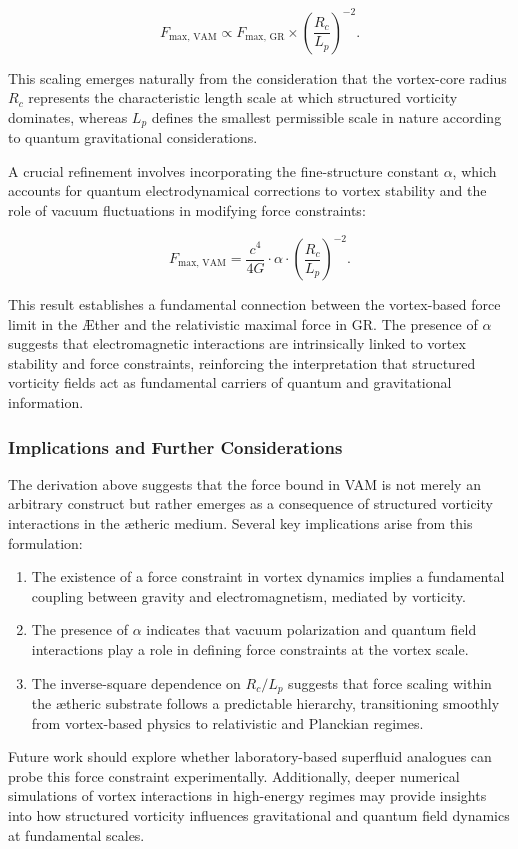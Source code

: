 \begin{equation*}
F_\text{max, VAM} \propto F_\text{max, GR} \times \left(\frac{R_c}{L_p}\right)^{-2}.
\end{equation*}


This scaling emerges naturally from the consideration that the vortex-core radius $R_c$ represents the characteristic length scale at which structured vorticity dominates, whereas $L_p$ defines the smallest permissible scale in nature according to quantum gravitational considerations.


A crucial refinement involves incorporating the fine-structure constant $\alpha$, which accounts for quantum electrodynamical corrections to vortex stability and the role of vacuum fluctuations in modifying force constraints:


\begin{equation*}
F_\text{max, VAM} = \frac{c^4}{4G} \cdot \alpha \cdot \left(\frac{R_c}{L_p}\right)^{-2}.
\end{equation*}


This result establishes a fundamental connection between the vortex-based force limit in the Æther and the relativistic maximal force in GR. The presence of $\alpha$ suggests that electromagnetic interactions are intrinsically linked to vortex stability and force constraints, reinforcing the interpretation that structured vorticity fields act as fundamental carriers of quantum and gravitational information.


\subsubsection*{Implications and Further Considerations}
The derivation above suggests that the force bound in VAM is not merely an arbitrary construct but rather emerges as a consequence of structured vorticity interactions in the ætheric medium. Several key implications arise from this formulation:
\begin{enumerate}
\item The existence of a force constraint in vortex dynamics implies a fundamental coupling between gravity and electromagnetism, mediated by vorticity.
\item The presence of $\alpha$ indicates that vacuum polarization and quantum field interactions play a role in defining force constraints at the vortex scale.
\item The inverse-square dependence on $R_c/L_p$ suggests that force scaling within the ætheric substrate follows a predictable hierarchy, transitioning smoothly from vortex-based physics to relativistic and Planckian regimes.
\end{enumerate}


Future work should explore whether laboratory-based superfluid analogues can probe this force constraint experimentally. Additionally, deeper numerical simulations of vortex interactions in high-energy regimes may provide insights into how structured vorticity influences gravitational and quantum field dynamics at fundamental scales.
